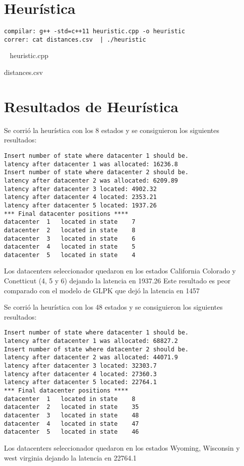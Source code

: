 \documentclass{article}
\begin{document}
\part{Heur\'istica}
\begin{verbatim}
compilar: g++ -std=c++11 heuristic.cpp -o heuristic
correr: cat distances.csv  | ./heuristic
\end{verbatim}

\
heuristic.cpp

distances.csv





\newpage
\part{Resultados de Heur\'istica}

Se corri\'o la heur\'istica con los 8 estados y se consiguieron los siguientes resultados:
\begin{verbatim}
Insert number of state where datacenter 1 should be.
latency after datacenter 1 was allocated: 16236.8
Insert number of state where datacenter 2 should be.
latency after datacenter 2 was allocated: 6209.89
latency after datacenter 3 located: 4902.32
latency after datacenter 4 located: 2353.21
latency after datacenter 5 located: 1937.26
*** Final datacenter positions ****
datacenter	1	located in state	7
datacenter	2	located in state	8
datacenter	3	located in state	6
datacenter	4	located in state	5
datacenter	5	located in state	4
\end{verbatim}

\smallskip
Los datacenters seleccionador quedaron en los estados California Colorado y Conetticut (4, 5 y 6) dejando la latencia en 1937.26
\smallskip
Este resultado es peor comparado con el modelo de GLPK que dej\'o la latencia en 1457
\bigskip


Se corri\'o la heur\'istica con los 48 estados y se consiguieron los siguientes resultados:
\begin{verbatim}
Insert number of state where datacenter 1 should be.
latency after datacenter 1 was allocated: 68827.2
Insert number of state where datacenter 2 should be.
latency after datacenter 2 was allocated: 44071.9
latency after datacenter 3 located: 32303.7
latency after datacenter 4 located: 27360.3
latency after datacenter 5 located: 22764.1
*** Final datacenter positions ****
datacenter	1	located in state	8
datacenter	2	located in state	35
datacenter	3	located in state	48
datacenter	4	located in state	47
datacenter	5	located in state	46

\end{verbatim}
\smallskip
Los datacenters seleccionador quedaron en los estados Wyoming, Wisconsin y west virginia dejando la latencia en 22764.1
\end{document}
